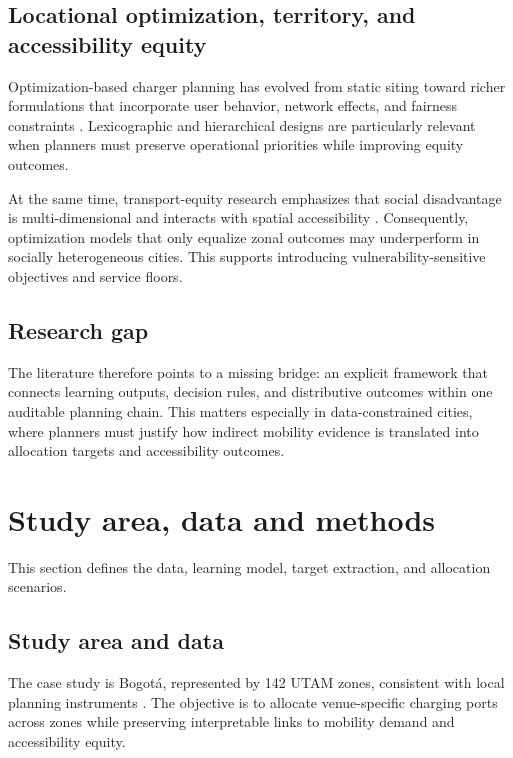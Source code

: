 \documentclass[final,5p,times,twocolumn,authoryear]{elsarticle}
\begin{document}
\subsection{Locational optimization, territory, and accessibility equity}

Optimization-based charger planning has evolved from static siting toward richer formulations
that incorporate user behavior, network effects, and fairness constraints
\citep{Zhang2023,Qiao2023,Zhou2023,Li2024,Sun2025}. Lexicographic and hierarchical designs are
particularly relevant when planners must preserve operational priorities while improving
equity outcomes.

At the same time, transport-equity research emphasizes that social disadvantage is
multi-dimensional and interacts with spatial accessibility \citep{Lucas2016,Delmelle2013}.
Consequently, optimization models that only equalize zonal outcomes may underperform in
socially heterogeneous cities. This supports introducing vulnerability-sensitive objectives
and service floors.

\subsection{Research gap}

The literature therefore points to a missing bridge: an explicit framework that connects
learning outputs, decision rules, and distributive outcomes within one auditable planning
chain. This matters especially in data-constrained cities, where planners must justify how
indirect mobility evidence is translated into allocation targets and accessibility outcomes.

\section{Study area, data and methods}

This section defines the data, learning model, target extraction, and allocation scenarios.

\subsection{Study area and data}

The case study is Bogot\'a, represented by 142 UTAM zones, consistent with local planning
instruments \citep{SDM2025}. The objective is to allocate venue-specific charging ports across
zones while preserving interpretable links to mobility demand and accessibility equity.
\end{document}
